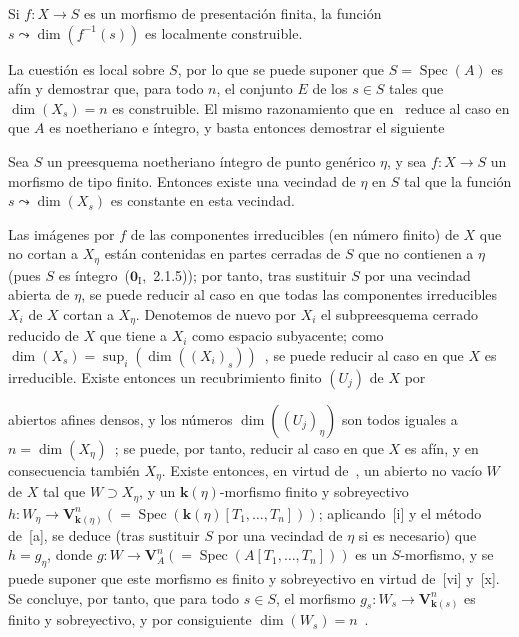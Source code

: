 \begin{proposition}[9.2.6.1]
\label{IV.9.2.6.1}
Si $f:X\to S$ es un morfismo de presentación finita, la función $s\leadsto\dim(f^{-1}(s))$ es localmente construible.
\end{proposition}

La cuestión es local sobre $S$, por lo que se puede suponer que $S=\operatorname{Spec}(A)$ es afín y demostrar que, para todo $n$, el conjunto $E$ de los $s\in S$ tales que $\dim(X_s)=n$ es construible.
El mismo razonamiento que en~ reduce al caso en que $A$ es noetheriano e íntegro, y basta entonces demostrar el siguiente

\begin{corollary}[9.2.6.2]
\label{IV.9.2.6.2}
Sea $S$ un preesquema noetheriano íntegro de punto genérico $\eta$, y sea $f:X\to S$ un morfismo de tipo finito.
Entonces existe una vecindad de $\eta$ en $S$ tal que la función $s\leadsto\dim(X_s)$ es constante en esta vecindad.
\end{corollary}

Las imágenes por $f$ de las componentes irreducibles (en número finito) de $X$ que no cortan a $X_\eta$ están contenidas en partes cerradas de $S$ que no contienen a $\eta$ (pues $S$ es íntegro~($\mathbf{0}_{\mathrm{I}}$,~2.1.5)); por tanto, tras sustituir $S$ por una vecindad abierta de $\eta$, se puede reducir al caso en que todas las componentes irreducibles $X_i$ de $X$ cortan a $X_\eta$.
Denotemos de nuevo por $X_i$ el subpreesquema cerrado reducido de $X$ que tiene a $X_i$ como espacio subyacente; como $\dim(X_s)=\sup_i(\dim((X_i)_s))$~, se puede reducir al caso en que $X$ es irreducible.
Existe entonces un recubrimiento finito $(U_j)$ de $X$ por

abiertos afines densos, y los números $\dim((U_j)_\eta)$ son todos iguales a $n=\dim(X_\eta)$~; se puede, por tanto, reducir al caso en que $X$ es afín, y en consecuencia también $X_\eta$.
Existe entonces, en virtud de~, un abierto no vacío $W$ de $X$ tal que $W\supset X_\eta$, y un $\boldsymbol{k}(\eta)$-morfismo finito y sobreyectivo $h:W_\eta\to\mathbf V_{\mathbf{k}(\eta)}^n
(=\operatorname{Spec}(\boldsymbol{k}(\eta)[T_1,\ldots,T_n]))$; aplicando~[i] y el método de~[a], se deduce (tras sustituir $S$ por una vecindad de $\eta$ si es necesario) que $h=g_\eta$, donde $g:W\to\mathbf V_A^n(=\operatorname{Spec}(A[T_1,\ldots,T_n]))$ es un $S$-morfismo, y se puede suponer que este morfismo es finito y sobreyectivo en virtud de~[vi] y~[x].
Se concluye, por tanto, que para todo $s\in S$, el morfismo $g_s:W_s\to\mathbf V_{\mathbf{k}(s)}^n$ es finito y sobreyectivo, y por consiguiente $\dim(W_s)=n$~.

